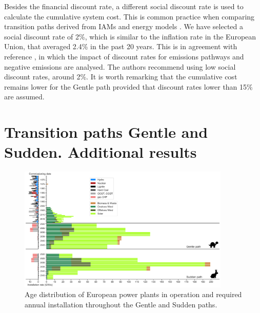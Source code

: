\documentclass[3p]{elsarticle} %
\begin{document}
Besides the financial discount rate, a different social discount rate is used to calculate the cumulative system cost. This is common practice when comparing transition paths derived from IAMs and energy models \cite{in-depth_2018, Hermelink_2015}. We have selected a social discount rate of 2\%, which is similar to the inflation rate in the European Union, that averaged 2.4\% in the past 20 years. This is in agreement with reference \cite{Emmerling_2019}, in which the impact of discount rates for  emissions pathways and negative emissions are analysed. The authors recommend using low social discount rates, around 2\%. It is worth remarking that the cumulative cost remains lower for the Gentle path provided that discount rates lower than 15\% are assumed.

\clearpage

\section{Transition paths Gentle and Sudden. Additional results}

\begin{figure}[!h]
\centering
\includegraphics[width=0.9\textwidth]{../figures/age_distribution_Base.png}
\caption{Age distribution of European power plants in operation \cite{powerplantmatching, IRENA_2019} and required annual installation throughout the Gentle and Sudden paths.} 
\end{figure}
\end{document}
